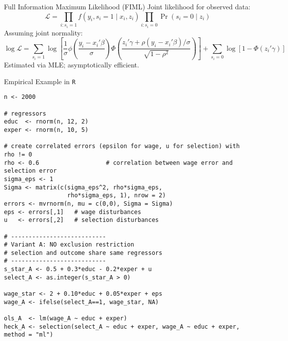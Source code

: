 \documentclass[aspectratio=169,11pt]{beamer}
\begin{document}
\begin{frame}{Full Information Maximum Likelihood (FIML)}
Joint likelihood for observed data:
\[
\mathcal{L} = \prod_{i : s_i=1} f(y_i, s_i=1 \mid x_i, z_i)
    \prod_{i: s_i=0} \Pr(s_i=0 \mid z_i)
\]
Assuming joint normality:
\[
\log \mathcal{L} = \sum_{s_i=1} \log \left[ 
\frac{1}{\sigma} \phi\left( \frac{y_i - x_i'\beta}{\sigma} \right)
\Phi\left( \frac{z_i'\gamma + \rho (y_i - x_i'\beta)/\sigma}{\sqrt{1-\rho^2}} \right)
\right]
+ \sum_{s_i=0} \log \left[ 1 - \Phi(z_i'\gamma) \right]
\]
Estimated via MLE; asymptotically efficient.
\end{frame}


\begin{frame}[fragile]{Empirical Example in \texttt{R}}
\begin{lstlisting}
n <- 2000

# regressors
educ  <- rnorm(n, 12, 2)
exper <- rnorm(n, 10, 5)

# create correlated errors (epsilon for wage, u for selection) with rho != 0
rho <- 0.6                   # correlation between wage error and selection error
sigma_eps <- 1
Sigma <- matrix(c(sigma_eps^2, rho*sigma_eps,
                  rho*sigma_eps, 1), nrow = 2)
errors <- mvrnorm(n, mu = c(0,0), Sigma = Sigma)
eps <- errors[,1]   # wage disturbances
u   <- errors[,2]   # selection disturbances

# ---------------------------
# Variant A: NO exclusion restriction
# selection and outcome share same regressors
# ---------------------------
s_star_A <- 0.5 + 0.3*educ - 0.2*exper + u
select_A <- as.integer(s_star_A > 0)

wage_star <- 2 + 0.10*educ + 0.05*exper + eps
wage_A <- ifelse(select_A==1, wage_star, NA)

ols_A  <- lm(wage_A ~ educ + exper)
heck_A <- selection(select_A ~ educ + exper, wage_A ~ educ + exper, method = "ml")
\end{lstlisting}
\end{frame}
\end{document}
